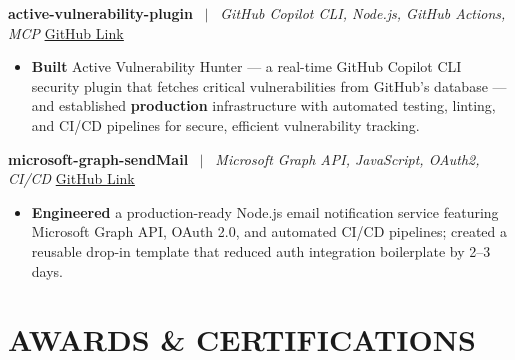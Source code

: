\documentclass[10pt,a4paper]{article}
\begin{document}
\vspace{2pt}

\noindent \textbf{active-vulnerability-plugin} \ $|$ \ \textit{GitHub Copilot CLI, Node.js, GitHub Actions, MCP} \hfill \href{https://github.com/Arshdeepdubey/active-vulnerability-plugin}{\underline{GitHub Link}}

\begin{itemize}

    \item \textbf{Built} Active Vulnerability Hunter — a real-time GitHub Copilot CLI security plugin that fetches critical vulnerabilities from GitHub's database — and established \textbf{production} infrastructure with automated testing, linting, and CI/CD pipelines for secure, efficient vulnerability tracking.

\end{itemize}

\vspace{2pt}

\noindent \textbf{microsoft-graph-sendMail} \ $|$ \ \textit{Microsoft Graph API, JavaScript, OAuth2, CI/CD} \hfill \href{https://github.com/Arshdeepdubey/microsoft-graph-sendMail}{\underline{GitHub Link}}

\begin{itemize}

    \item \textbf{Engineered} a production-ready Node.js email notification service featuring Microsoft Graph API, OAuth 2.0, and automated CI/CD pipelines; created a reusable drop-in template that reduced auth integration boilerplate by 2--3 days.

\end{itemize}



\section*{AWARDS \& CERTIFICATIONS}
\end{document}
